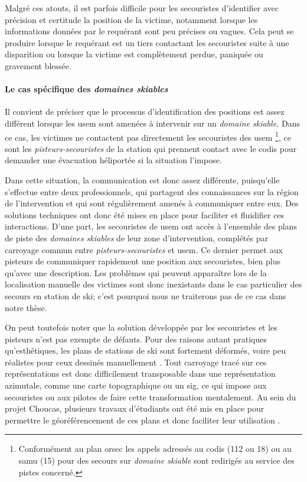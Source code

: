 Malgré ces atouts, il est parfois difficile pour les secouristes
d'identifier avec précision et certitude la position de la victime,
notamment lorsque les informations données par le requérant sont peu
précises ou vagues. Cela peut se produire lorsque le requérant est un
tiers contactant les secouristes suite à une disparition ou lorsque la
victime est complètement perdue, paniquée ou gravement blessée.

\paragraph{Le cas spécifique des \emph{domaines skiables}}

Il convient de préciser que le processus d'identification des
positions est assez différent lorsque les \ac{usem} sont amenées à
intervenir sur un \emph{domaine skiable.} Dans ce cas, les victimes ne
contactent pas directement les secouristes des \ac{usem}
\footnote{Conformément au plan \ac{orsec} les appels adressés au
  \ac{codis} (112 ou 18) ou au \ac{samu} (15) pour des secours sur
  \emph{domaine skiable} sont redirigés au service des pistes
  concerné.}, ce sont les \emph{pisteurs-secouristes} de la station
qui prennent contact avec le \ac{codis} pour demander une évacuation
héliportée si la situation l'impose.

Dans cette situation, la communication est donc assez différente,
puisqu'elle s'effectue entre deux professionnels, qui partagent des
connaissances sur la région de l'intervention et qui sont
régulièrement amenés à communiquer entre eux. Des solutions techniques
ont donc été mises en place pour faciliter et fluidifier ces
interactions. D'une part, les secouristes de \ac{usem} ont accès à
l'ensemble des plans de piste des \emph{domaines skiables} de leur
zone d'intervention, complétés par carroyage commun entre
\emph{pisteurs-secouristes} et \ac{usem}. Ce dernier permet aux
pisteurs de communiquer rapidement une position aux secouristes, bien
plus qu'avec une description. Les problèmes qui peuvent apparaître
lors de la localisation manuelle des victimes sont donc inexistants
dans le cas particulier des secours en station de ski; c'est pourquoi
nous ne traiterons pas de ce cas dans notre thèse.

On peut toutefois noter que la solution développée par les secouristes
et les pisteurs n'est pas exempte de défauts. Pour des raisons autant
pratiques qu’esthétiques, les plans de stations de ski sont fortement
déformés, voire peu réalistes pour ceux dessinés manuellement
\autocite{Gauchon2014,LaPorte2017}. Tout carroyage tracé sur ces
représentations est donc difficilement transposable dans une
représentation azimutale, comme une carte topographique ou un
\ac{sig}, ce qui impose aux secouristes ou aux pilotes de faire cette
transformation mentalement. Au sein du projet Choucas, plusieurs
travaux d'étudiants ont été mis en place pour permettre le
géoréférencement de ces plans et donc faciliter leur utilisation
\autocite{Gauer2019,Xi2020}.

